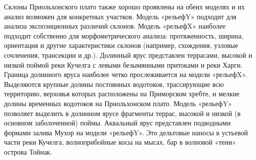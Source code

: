 \documentclass[runningheads]{AIIT}
\begin{document}
Склоны Приольхонского плато также хорошо проявлены на обеих моделях и их анализ возможен для конкретных участков. Модель «рельефY» подходит для анализа экспозиционных различий склонов. Модель «рельефX» наиболее подходит собственно для морфометрического анализа: протяженность, ширина, ориентация и другие характеристики склонов (например, схождения, узловые сочленения, трансекции и др.).
Долинный ярус представлен террасами, высокой и низкой поймой реки Кучелга с левыми безымянными притоками и реки Харги.
Граница долинного яруса наиболее четко прослеживается на модели «рельефX». Выделяются крупные долины постоянных водотоков, трассирующие всю территорию, верховья которых расположены на Приморском хребте, и мелкие долины временных водотоков на Приольхонском плато. Модель «рельефY» позволяет выделить в долинном ярусе фрагменты террас, высокой и низкой (в основном заболоченной) поймы.
Аквальный ярус представлен подводными формами залива Мухор на модели «рельефY». Это дельтовые наносы в устьевой части реки Кучелга, волноприбойные косы на мысах, бар в волновой «тени» острова Тойнак.
\end{document}
